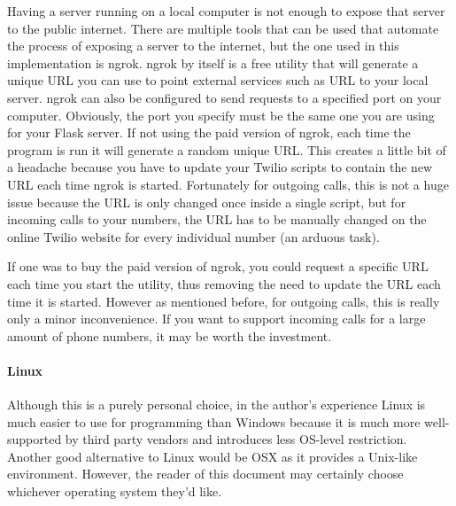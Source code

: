 \documentclass[10pt]{report}
\begin{document}
Having a server running on a local computer is not enough to expose that server to the public internet. There are multiple tools that can be used that automate the process of exposing a server to the internet, but the one used in this implementation is ngrok. ngrok by itself is a free utility that will generate a unique URL you can use to point external services such as URL to your local server. ngrok can also be configured to send requests to a specified port on your computer. Obviously, the port you specify must be the same one you are using for your Flask server. If not using the paid version of ngrok, each time the program is run it will generate a random unique URL. This creates a little bit of a headache because you have to update your Twilio scripts to contain the new URL each time ngrok is started. Fortunately for outgoing calls, this is not a huge issue because the URL is only changed once inside a single script, but for incoming calls to your numbers, the URL has to be manually changed on the online Twilio website for every individual number (an arduous task).

If one was to buy the paid version of ngrok, you could request a specific URL each time you start the utility, thus removing the need to update the URL each time it is started. However as mentioned before, for outgoing calls, this is really only a minor inconvenience. If you want to support incoming calls for a large amount of phone numbers, it may be worth the investment.

\paragraph{Linux}

Although this is a purely personal choice, in the author's experience Linux is much easier to use for programming than Windows because it is much more well-supported by third party vendors and introduces less OS-level restriction. Another good alternative to Linux would be OSX as it provides a Unix-like environment. However, the reader of this document may certainly choose whichever operating system they'd like.
\end{document}
